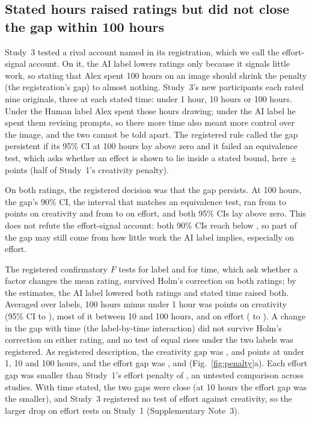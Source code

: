 \subsection*{Stated hours raised ratings but did not close the gap within 100 hours}

Study~3 tested a rival account named in its registration, which we call the effort-signal account. On it, the AI label lowers ratings only because it signals little work, so stating that Alex spent 100 hours on an image should shrink the penalty (the registration's gap) to almost nothing. Study~3's \SThreeN{} new participants each rated nine originals, three at each stated time: under 1 hour, 10 hours or 100 hours. Under the Human label Alex spent those hours drawing; under the AI label he spent them revising prompts, so there more time also meant more control over the image, and the two cannot be told apart. The registered rule called the gap persistent if its 95\% CI at 100 hours lay above zero and it failed an equivalence test, which asks whether an effect is shown to lie inside a stated bound, here $\pm$\SourceBound{} points (half of Study~1's creativity penalty).\cite{schuirmann1987comparison,lakens2017equivalence}

On both ratings, the registered decision was that the gap persists. At 100 hours, the gap's 90\% CI, the interval that matches an equivalence test, ran from \SThreeCreatGapHundredLoNinety{} to \SThreeCreatGapHundredHiNinety{} points on creativity and from \SThreeEffGapHundredLoNinety{} to \SThreeEffGapHundredHiNinety{} on effort, and both 95\% CIs lay above zero. This does not refute the effort-signal account: both 90\% CIs reach below \SourceBound, so part of the gap may still come from how little work the AI label implies, especially on effort.

The registered confirmatory $F$ tests for label and for time, which ask whether a factor changes the mean rating, survived Holm's correction on both ratings; by the estimates, the AI label lowered both ratings and stated time raised both. Averaged over labels, 100 hours minus under 1 hour was \SThreeCreatTimeContrastEst{} points on creativity (95\% CI \SThreeCreatTimeContrastLo{} to \SThreeCreatTimeContrastHi), most of it between 10 and 100 hours, and \SThreeEffTimeContrastEst{} on effort (\SThreeEffTimeContrastLo{} to \SThreeEffTimeContrastHi). A change in the gap with time (the label-by-time interaction) did not survive Holm's correction on either rating, and no test of equal rises under the two labels was registered. As registered description, the creativity gap was \SThreeCreatGapUnderOneHourEst, \SThreeCreatGapTenHoursEst{} and \SThreeCreatGapHundredHoursEst{} points at under 1, 10 and 100 hours, and the effort gap was \SThreeEffGapUnderOneHourEst, \SThreeEffGapTenHoursEst{} and \SThreeEffGapHundredHoursEst{} (Fig.~\ref{fig:penalty}a). Each effort gap was smaller than Study~1's effort penalty of \SOneHOneEffDiff, an untested comparison across studies. With time stated, the two gaps were close (at 10 hours the effort gap was the smaller), and Study~3 registered no test of effort against creativity, so the larger drop on effort rests on Study~1 (Supplementary Note~3).

